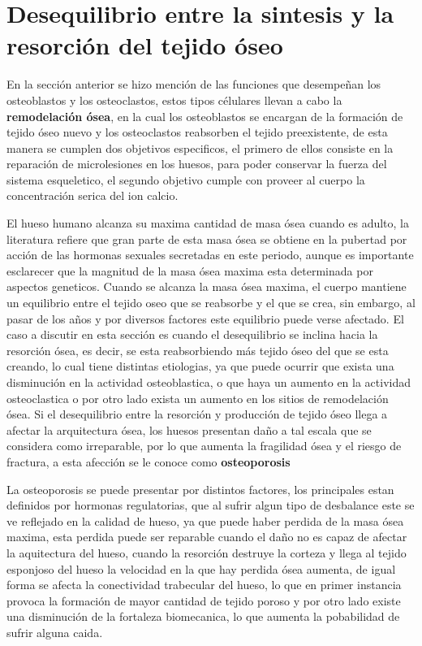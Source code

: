 \documentclass[letterpaper,12pt,oneside]{book}
\begin{document}
 



    
    \section{Desequilibrio entre la sintesis y la resorción del tejido óseo}

    En la sección anterior se hizo mención de las funciones que desempeñan los osteoblastos y los osteoclastos, estos tipos célulares llevan a cabo la \textbf{remodelación ósea}, en la cual los osteoblastos se encargan de la formación de tejido óseo nuevo y los osteoclastos reabsorben el tejido preexistente, de esta manera se cumplen dos objetivos especificos, el primero de ellos consiste en la reparación de microlesiones en los huesos, para poder conservar la fuerza del sistema esqueletico, el segundo objetivo cumple con proveer al cuerpo la  concentración serica del ion calcio. 

    \vspace{10pt}

    El hueso humano alcanza su maxima cantidad de masa ósea cuando es adulto, la literatura refiere que gran parte de esta masa ósea se obtiene en la pubertad por acción de las hormonas sexuales secretadas en este periodo, aunque es importante esclarecer que la magnitud de la masa ósea maxima esta determinada por aspectos geneticos. Cuando se alcanza la masa ósea maxima, el cuerpo mantiene un equilibrio entre el tejido oseo que se reabsorbe y el que se crea, sin embargo, al pasar de los años y por diversos factores este equilibrio puede verse afectado. El caso a discutir en esta sección es cuando el desequilibrio se inclina hacia la resorción ósea, es decir, se esta reabsorbiendo más tejido óseo del que se esta creando, lo cual tiene distintas etiologias, ya que puede ocurrir que exista una disminución en la actividad osteoblastica, o que haya un aumento en la actividad osteoclastica o por otro lado exista un aumento en los sitios de remodelación ósea. Si el desequilibrio entre la resorción y producción de tejido óseo llega a afectar la arquitectura ósea, los huesos presentan daño a tal escala que se considera como irreparable, por lo que aumenta la fragilidad ósea y el riesgo de fractura, a esta afección se le conoce como \textbf{osteoporosis}

    \vspace{10pt}

    La osteoporosis se puede presentar por distintos factores, los principales estan definidos por hormonas regulatorias, que al sufrir algun tipo de desbalance este se ve reflejado en la calidad de hueso, ya que puede haber perdida de la masa ósea maxima, esta perdida puede ser reparable cuando el daño no es capaz de afectar la aquitectura del hueso, cuando la resorción destruye la corteza y llega al tejido esponjoso del hueso la velocidad en la que hay perdida ósea aumenta, de igual forma se afecta la conectividad trabecular del hueso, lo que en primer instancia provoca la formación de mayor cantidad de tejido poroso y por otro lado existe una disminución de la fortaleza biomecanica, lo que aumenta la pobabilidad de sufrir alguna caida. 
\end{document}
